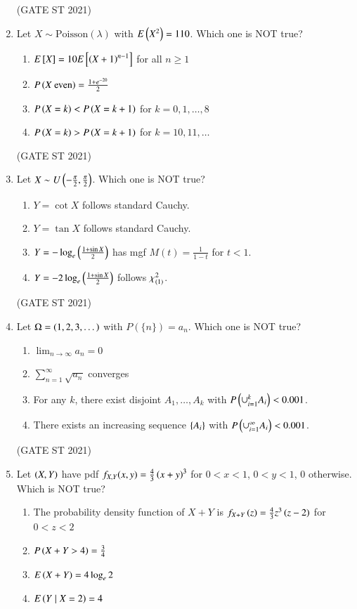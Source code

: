 \documentclass[journal,12pt,onecolumn]{IEEEtran}
\theoremstyle{remark}
\begin{document}
\begin{enumerate}
\hfill (GATE ST 2021) \\
\item
Let $X \sim \text{Poisson}(\lambda)$ with $E\left(X^2\right) = 110$. Which one is NOT true?
\begin{enumerate}
\item $E{}\left[X\right] = 10 E{}\left[\left(X+1\right)^{n-1}\right]$ for all $n \ge 1$
\item $P\left(X \ \text{even}\right) = \frac{1 + e^{-20}}{2}$
\item $P\left(X = k\right) < P\left(X = k+1\right)$ for $k = 0, 1, \dots, 8$
\item $P\left(X = k\right) > P\left(X = k+1\right)$ for $k = 10, 11, \dots$
\end{enumerate}

\hfill (GATE ST 2021) \\
\item
Let $
X \sim U\left(-\frac{\pi}{2}, \frac{\pi}{2}\right)$. Which one is NOT true?
\begin{enumerate}
\item $Y = \cot X$ follows standard Cauchy.
\item $Y = \tan X$ follows standard Cauchy.
\item $Y = -\log_e \left(\frac{1+ \sin X}{2}\right)$ has mgf $M(t) = \frac{1}{1-t}$ for $t<1$.
\item $Y = -2\log_e\left( \frac{1 + \sin X}{2} \right)$ follows $\chi^2_{\left(1\right)}$.
\end{enumerate}

\hfill (GATE ST 2021) \\
\item
Let $\Omega = \left(1,2,3,\dots\right)$ with $P(\{n\}) = a_n$. Which one is NOT true?
\begin{enumerate}
\item $\lim_{n\to\infty} a_n = 0$
\item $\sum_{n=1}^\infty \sqrt{a_n}$ converges
\item For any $k$, there exist disjoint $A_1, \dots, A_k$ with $P\left(\cup_{i=1}^k A_i\right) < 0.001$.
\item There exists an increasing sequence $\left\{A_i\right\}$ with $P\left(\cup_{i=1}^\infty A_i\right) < 0.001$.
\end{enumerate}

\hfill (GATE ST 2021) \\
\item
Let $\left(X,Y\right)$ have pdf $f_{X,Y}(x,y) = \frac{4}{3}\left(x+y\right)^3$ for $0 < x < 1$, $0 < y < 1$, $0$ otherwise. Which is NOT true?
\begin{enumerate}
\item The probability density function of $X+Y$ is $f_{X+Y}\left(z\right) = \frac{4}{3} z^3 \left(z-2\right)$ for $0<z<2$
\item $P\left(X+Y > 4\right) = \frac{3}{4}$
\item $E\left(X+Y\right) = 4 \log_e 2$
\item $E\left(Y \mid X=2\right) = 4$
\end{enumerate}


\end{enumerate}
\end{document}
